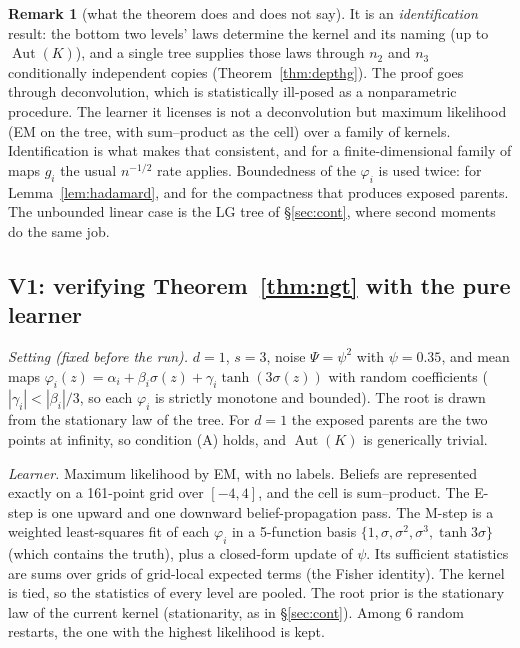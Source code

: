 \documentclass[11pt]{article}
\theoremstyle{definition}
\newtheorem{remark}[theorem]{Remark}
\begin{document}
\begin{remark}[what the theorem does and does not say]
It is an \emph{identification} result: the bottom two levels' laws determine the kernel and its
naming (up to $\operatorname{Aut}(K)$), and a single tree supplies those laws through $n_2$ and $n_3$
conditionally independent copies (Theorem~\ref{thm:depthg}). The proof goes through deconvolution,
which is statistically ill-posed as a nonparametric procedure. The learner it licenses is not a
deconvolution but maximum likelihood (EM on the tree, with sum--product as the cell) over a family of
kernels. Identification is what makes that consistent, and for a finite-dimensional family of maps $g_i$
the usual $n^{-1/2}$ rate applies. Boundedness of the $\varphi_i$ is used twice: for
Lemma~\ref{lem:hadamard}, and for the compactness that produces exposed parents. The unbounded linear
case is the LG tree of \S\ref{sec:cont}, where second moments do the same job.
\end{remark}

\subsection{V1: verifying Theorem~\ref{thm:ngt} with the pure learner}\label{sec:v1}
\emph{Setting (fixed before the run).} $d=1$, $s=3$, noise $\Psi=\psi^2$ with $\psi=0.35$, and mean maps
$\varphi_i(z)=\alpha_i+\beta_i\sigma(z)+\gamma_i\tanh(3\sigma(z))$ with random coefficients
($|\gamma_i|<|\beta_i|/3$, so each $\varphi_i$ is strictly monotone and bounded). The root is drawn from
the stationary law of the tree. For $d=1$ the exposed parents are the two points at infinity, so
condition (A) holds, and $\operatorname{Aut}(K)$ is generically trivial.

\emph{Learner.} Maximum likelihood by EM, with no labels. Beliefs are represented exactly on a
161-point grid over $[-4,4]$, and the cell is sum--product. The E-step is one upward and one downward
belief-propagation pass. The M-step is a weighted least-squares fit of each $\varphi_i$ in a 5-function
basis $\{1,\sigma,\sigma^2,\sigma^3,\tanh3\sigma\}$ (which contains the truth), plus a closed-form update
of $\psi$. Its sufficient statistics are sums over grids of grid-local expected terms (the Fisher
identity). The kernel is tied, so the statistics of every level are pooled. The root prior is the
stationary law of the current kernel (stationarity, as in \S\ref{sec:cont}). Among 6 random
restarts, the one with the highest likelihood is kept.
\end{document}
